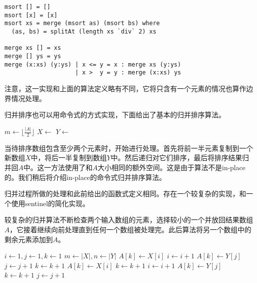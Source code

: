 \documentclass[UTF8]{article}
\begin{document}
\lstset{language=Haskell}
\begin{lstlisting}
msort [] = []
msort [x] = [x]
msort xs = merge (msort as) (msort bs) where
  (as, bs) = splitAt (length xs `div` 2) xs

merge xs [] = xs
merge [] ys = ys
merge (x:xs) (y:ys) | x <= y = x : merge xs (y:ys)
                    | x >  y = y : merge (x:xs) ys
\end{lstlisting}

注意，这一实现和上面的算法定义略有不同，它将只含有一个元素的情况也算作边界情况处理。

归并排序也可以用命令式的方式实现，下面给出了基本的归并排序算法。

\begin{algorithmic}[1]
    \State $m \gets \lfloor \frac{|A|}{2} \rfloor$
    \State $X \gets$ 
    \State $Y \gets$ 
    \State {}
    \State {}
    \State {}
  \EndIf
\EndProcedure
\end{algorithmic}

当待排序数组包含至少两个元素时，开始进行处理。首先将前一半元素复制到一个新数组$X$中，将后一半复制到数组$Y$中。然后递归对它们排序，最后将排序结果归并回$A$中。这一方法使用了和$A$大小相同的额外空间。这是由于算法不是in-place的。我们稍后将介绍in-place的命令式归并排序算法。

归并过程所做的处理和此前给出的函数式定义相同。存在一个较复杂的实现，和一个使用sentinel的简化实现。

较复杂的归并算法不断检查两个输入数组的元素，选择较小的一个并放回结果数组$A$，它接着继续向前处理直到任何一个数组被处理完。此后算法将另一个数组中的剩余元素添加到$A$。

\begin{algorithmic}[1]
  \State $i \gets 1, j\gets 1, k\gets 1$
  \State $m \gets |X|, n \gets |Y|$
      \State $A[k] \gets X[i]$
      \State $i \gets i + 1$
    \Else
      \State $A[k] \gets Y[j]$
      \State $j \gets j + 1$
    \EndIf
    \State $k \gets k + 1$
  \EndWhile
    \State $A[k] \gets X[i]$
    \State $k \gets k + 1$
    \State $i \gets i + 1$
  \EndWhile
    \State $A[k] \gets Y[j]$
    \State $k \gets k + 1$
    \State $j \gets j + 1$
  \EndWhile
\EndProcedure
\end{algorithmic}
\end{document}
